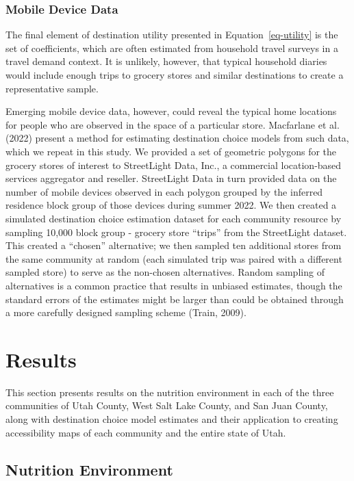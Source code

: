 \documentclass[
  letterpaper,
  number,
  review,
  3p]{elsarticle}
\begin{document}
\subsubsection{Mobile Device Data}\label{mobile-device-data}

The final element of destination utility presented in
Equation~\ref{eq-utility} is the set of coefficients, which are often
estimated from household travel surveys in a travel demand context. It
is unlikely, however, that typical household diaries would include
enough trips to grocery stores and similar destinations to create a
representative sample.

Emerging mobile device data, however, could reveal the typical home
locations for people who are observed in the space of a particular
store. Macfarlane et al. (2022) present a method for estimating
destination choice models from such data, which we repeat in this study.
We provided a set of geometric polygons for the grocery stores of
interest to StreetLight Data, Inc., a commercial location-based services
aggregator and reseller. StreetLight Data in turn provided data on the
number of mobile devices observed in each polygon grouped by the
inferred residence block group of those devices during summer 2022. We
then created a simulated destination choice estimation dataset for each
community resource by sampling 10,000 block group - grocery store
``trips'' from the StreetLight dataset. This created a ``chosen''
alternative; we then sampled ten additional stores from the same
community at random (each simulated trip was paired with a different
sampled store) to serve as the non-chosen alternatives. Random sampling
of alternatives is a common practice that results in unbiased estimates,
though the standard errors of the estimates might be larger than could
be obtained through a more carefully designed sampling scheme (Train,
2009).


\section{Results}\label{sec-results}

This section presents results on the nutrition environment in each of
the three communities of Utah County, West Salt Lake County, and San
Juan County, along with destination choice model estimates and their
application to creating accessibility maps of each community and the
entire state of Utah.

\subsection{Nutrition Environment}\label{sec-nems}
\end{document}
